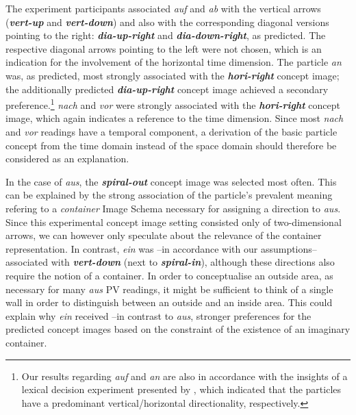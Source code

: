 \documentclass[output=paper]{langsci/langscibook}
\newcommand{\textci}[1]{\textit{\textbf{#1}}}
\begin{document}
The experiment participants associated \textit{auf} and \textit{ab}
with the vertical arrows (\textci{vert-up} and \textci{vert-down}) and
also with the corresponding diagonal versions pointing to the right:
\textci{dia-up-right} and \textci{dia-down-right}, as predicted. The
respective diagonal arrows pointing to the left were not chosen, which
is an indication for the involvement of the horizontal time dimension.
%
The particle \textit{an} was, as predicted, most strongly associated
with the \textci{hori-right} concept image; the additionally predicted
\textci{dia-up-right} concept image achieved a secondary preference.\footnote{Our
  results regarding \textit{auf} and \textit{an} are also in
  accordance with the insights of a lexical decision experiment
  presented by \cite{FrassinelliEtAl:17}, which indicated that the
  particles have a predominant vertical/horizontal directionality,
  respectively.}
%
\textit{nach} and \textit{vor} were strongly associated with the
\textci{hori-right} concept image, which again indicates a reference to the time
dimension. Since most \textit{nach} and \textit{vor} readings have a
temporal component, a derivation of the basic particle concept from
the time domain instead of the space domain should therefore be
considered as an explanation.

In the case of \textit{aus}, the \textci{spiral-out} concept image was selected
most often. This can be explained by the strong association of the
particle's prevalent meaning refering to a \textit{container} Image
Schema necessary for assigning a direction to \textit{aus}. Since this
experimental concept image setting consisted only of two-dimensional arrows, we
can however only speculate about the relevance of the container
representation. In contrast, \textit{ein} was --in accordance with our
assumptions-- associated with \textci{vert-down} (next to
\textci{spiral-in}), although these directions also require the notion
of a container. In order to conceptualise an outside area, as
necessary for many \textit{aus} PV readings, it might be sufficient to
think of a single wall in order to distinguish between an outside and
an inside area. This could explain why \textit{ein} received --in
contrast to \textit{aus}, stronger preferences for the predicted concept images
based on the constraint of the existence of an imaginary container.
\end{document}
